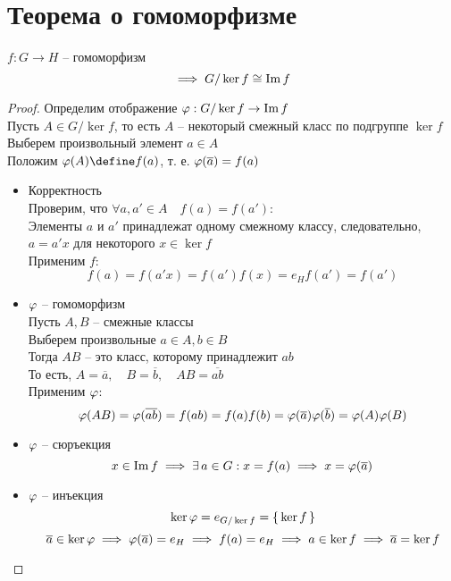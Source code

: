 \section{Теорема о гомоморфизме}

\begin{theorem}
	$ f : G \to H $ -- гомоморфизм
	$$ \implies G/\ker f \cong \operatorname{Im} f $$
\end{theorem}

\begin{proof}
	Определим отображение $ \varphi : G/\ker f \to \operatorname{Im} f $ \\
	Пусть $ A \in G/\ker f $, то есть $ A $ -- некоторый смежный класс по подгруппе $ \ker f $ \\
	Выберем произвольный элемент $ a \in A $ \\
	Положим $ \vphi(A) \define f(a) $, т. е. $ \varphi(\overline{a}) = f(a) $
	\begin{itemize}
		\item Корректность \\
		Проверим, что $ \forall a, a' \in A \quad f(a) = f(a') $: \\
		Элементы $ a $ и $ a' $ принадлежат одному смежному классу, следовательно, $ a = a'x $ для некоторого $ x \in \ker f $ \\
		Применим $ f $:
		$$ f(a) = f(a'x) = f(a')f(x) = e_Hf(a') = f(a') $$
		\item $ \varphi $ -- гомоморфизм \\
		Пусть $ A, B $ -- смежные классы \\
		Выберем произвольные $ a \in A, b \in B $ \\
		Тогда $ AB $ -- это класс, которому принадлежит $ ab $ \\
		То есть, $ A = \overline{a}, \quad B = \overline{b}, \quad AB = \overline{ab} $ \\
		Применим $ \varphi $:
		$$ \varphi(AB) = \varphi(\overline{ab}) = f(ab) = f(a)f(b) = \varphi(\overline{a})\varphi(\overline{b}) = \varphi(A)\varphi(B) $$
		\item $ \varphi $ -- сюръекция
		$$ x \in \operatorname{Im} f \implies \exists\, a \in G : x = f(a) \implies x = \varphi(\overline{a}) $$
		\item $ \varphi $ -- инъекция
		$$ \ker \varphi = e_{G/\ker f} = \set{\ker f} $$
		$$ \overline{a} \in \ker \varphi \implies \varphi(\overline{a}) = e_H \implies f(a) = e_H \implies a \in \ker f \implies \overline{a} = \ker f $$
	\end{itemize}
\end{proof}

